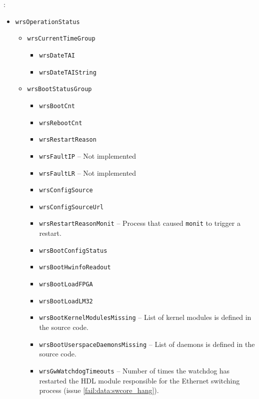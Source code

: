 :
\begin{itemize}
  \item \texttt{wrsOperationStatus}
    \begin{itemize}
      \item \texttt{wrsCurrentTimeGroup}
	\begin{itemize}
	  \item \texttt{wrsDateTAI}
	  \item \texttt{wrsDateTAIString}
	\end{itemize}
      \item \texttt{wrsBootStatusGroup}
	\begin{itemize}
	  \item \texttt{wrsBootCnt}
	  \item \texttt{wrsRebootCnt}
	  \item \texttt{wrsRestartReason}
	  \item \texttt{wrsFaultIP} -- Not implemented
	  \item \texttt{wrsFaultLR} -- Not implemented
	  \item \texttt{wrsConfigSource}
	  \item \texttt{wrsConfigSourceUrl}
	  \item \texttt{wrsRestartReasonMonit} -- Process that caused \texttt{monit}
	    to trigger a restart.
	  \item \texttt{wrsBootConfigStatus}
	  \item \texttt{wrsBootHwinfoReadout}
	  \item \texttt{wrsBootLoadFPGA}
	  \item \texttt{wrsBootLoadLM32}
	  \item \texttt{wrsBootKernelModulesMissing} -- List of kernel modules is
	    defined in the source code.
	  \item \texttt{wrsBootUserspaceDaemonsMissing} -- List of daemons is defined
	    in the source code.
	  \item \texttt{wrsGwWatchdogTimeouts} -- Number of times the watchdog has
	    restarted the HDL module responsible for the Ethernet switching process
	    (issue \ref{fail:data:swcore_hang}).


\end{itemize}
\end{itemize}
\end{itemize}
